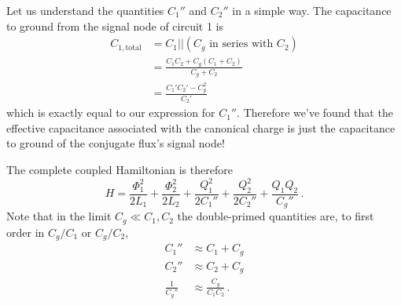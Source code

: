 Let us understand the quantities $C_1''$ and $C_2''$ in a simple way.
The capacitance to ground from the signal node of circuit 1 is
\begin{align*}
  C_{1, \textrm{total}}
  &= C_1 || (C_g \textrm{ in series with } C_2) \\
  &= \frac{C_1 C_2 + C_g(C_1+C_2)}{C_g+C_2} \\
  &= \frac{C_1' C_2' - C_g^2}{C_2'}
\end{align*}
which is exactly equal to our expression for $C_1''$.
Therefore we've found that the effective capacitance associated with the canonical charge is just the capacitance to ground of the conjugate flux's signal node!

The complete coupled Hamiltonian is therefore
\begin{equation}
  H =
    \frac{\Phi_1^2}{2 L_1}
  + \frac{\Phi_2^2}{2 L_2}
  + \frac{Q_1^2}{2 C_1''}
  + \frac{Q_2^2}{2 C_2''}
  + \frac{Q_1 Q_2}{C_g''} \, .
\end{equation}
Note that in the limit $C_g \ll C_1, C_2$ the double-primed quantities are, to first order in $C_g / C_1$ or $C_g / C_2$,
\begin{align*}
  C_1'' & \approx C_1 + C_g \\
  C_2'' & \approx C_2 + C_g \\
  \frac{1}{C_g''} & \approx \frac{C_g}{C_1 C_2} \, .
\end{align*}

